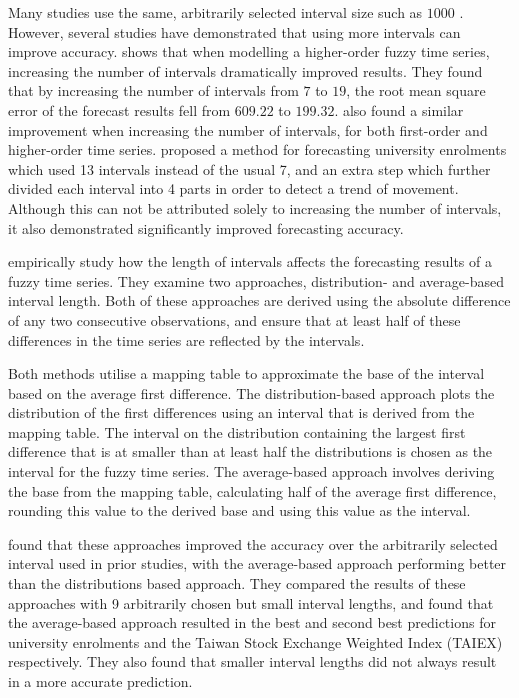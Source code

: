 \documentclass[12pt]{article}
\theoremstyle{definition}
\begin{document}
Many studies use the same, arbitrarily selected interval size such as $1000$ \citep{song1993forecasting, song1994forecasting, chen1996forecasting, tsai2000forecasting, chen2004new}. However, several studies have demonstrated that using more intervals can improve accuracy. \citep{tsai2000forecasting} shows that when modelling a higher-order fuzzy time series, increasing the number of intervals dramatically improved results. They found that by increasing the number of intervals from $7$ to $19$, the root mean square error of the forecast results fell from $609.22$ to $199.32$. \cite{tsai1999study} also found a similar improvement when increasing the number of intervals, for both first-order and higher-order time series. \cite{chen2004new} proposed a method for forecasting university enrolments which used 13 intervals instead of the usual 7, and an extra step which further divided each interval into 4 parts in order to detect a trend of movement. Although this can not be attributed solely to increasing the number of intervals, it also demonstrated significantly improved forecasting accuracy. 	

\cite{Huarng2001effective} empirically study how the length of intervals affects the forecasting results of a fuzzy time series. They examine two approaches, distribution- and average-based interval length. Both of these approaches are derived using the absolute difference of any two consecutive observations, and ensure that at least half of these differences in the time series are reflected by the intervals. 

Both methods utilise a mapping table to approximate the base of the interval based on the average first difference. The distribution-based approach plots the distribution of the first differences using an interval that is derived from the mapping table. The interval on the distribution containing the largest first difference that is at smaller than at least half the distributions is chosen as the interval for the fuzzy time series. The average-based approach involves deriving the base from the mapping table, calculating half of the average first difference, rounding this value to the derived base and using this value as the interval.

\cite{Huarng2001effective} found that these approaches improved the accuracy over the arbitrarily selected interval used in prior studies, with the average-based approach performing better than the distributions based approach. They compared the results of these approaches with 9 arbitrarily chosen but small interval lengths, and found that the average-based approach resulted in the best and second best predictions for university enrolments and the Taiwan Stock Exchange Weighted Index (TAIEX) respectively. They also found that smaller interval lengths did not always result in a more accurate prediction.
\end{document}
